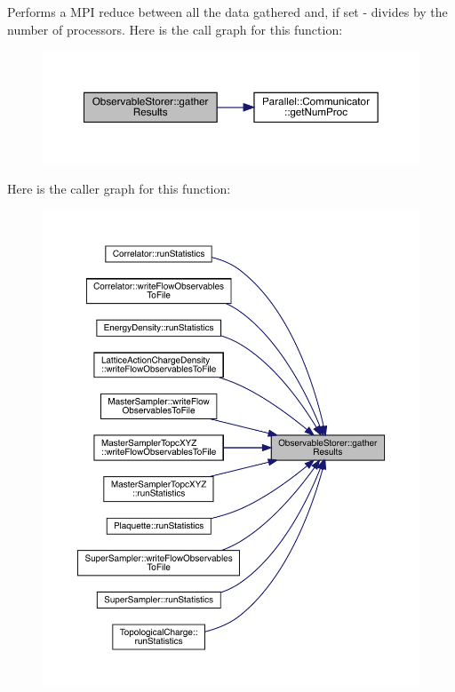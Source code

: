 Performs a M\+PI reduce between all the data gathered and, if set -\/ divides by the number of processors. Here is the call graph for this function\+:
\nopagebreak
\begin{figure}[H]
\begin{center}
\leavevmode
\includegraphics[width=350pt]{class_observable_storer_a593f13b0dd0f9d20608ef6b84fda3f1d_cgraph}
\end{center}
\end{figure}
Here is the caller graph for this function\+:
\nopagebreak
\begin{figure}[H]
\begin{center}
\leavevmode
\includegraphics[width=350pt]{class_observable_storer_a593f13b0dd0f9d20608ef6b84fda3f1d_icgraph}
\end{center}
\end{figure}
\mbox{\label{class_observable_storer_af03e1c58c3e0efff251ef9b65cc8d152}} 

